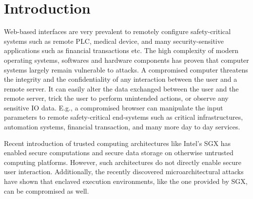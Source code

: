 \section{Introduction}
\label{sec:intro}

Web-based interfaces are very prevalent to remotely configure safety-critical systems such as remote PLC, medical device, and many security-sensitive applications such as financial transactions etc. The high complexity of modern operating systems, softwares and hardware components has proven that computer systems largely remain vulnerable to attacks. A compromised computer threatens the integrity and the confidentiality of any interaction between the user and a remote server. It can easily alter the data exchanged between the user and the remote server, trick the user to perform unintended actions, or observe any sensitive IO data. E.g., a compromised browser can manipulate the input parameters to remote safety-critical end-systems such as critical infrastructures, automation systems, financial transaction, and many more day to day services.

Recent introduction of trusted computing architectures like Intel's SGX has enabled secure computations and secure data storage on otherwise untrusted computing platforms. However, such architectures do not directly enable secure user interaction. Additionally, the recently discovered microarchitectural attacks have shown that enclaved execution environments, like the one provided by SGX, can be compromised as well.

\iffalse
\begin{figure}[t]
\centering
\texttt{[image: motivation.pdf]}
\caption{\textbf{Motivating examples.} 1) Pointer based UI elements that sets parameters to remote safety-critical device, 2) E-voting where the voting privacy and integrity is critical, 3) Financial transactions such as bitcoin wallet that shows sensitive information such as the user's private key and 4) web applications that provide an option for the user to reveal credentials.}
\spacesave
\label{fig:motivation}
\centering
\end{figure}
\fi


